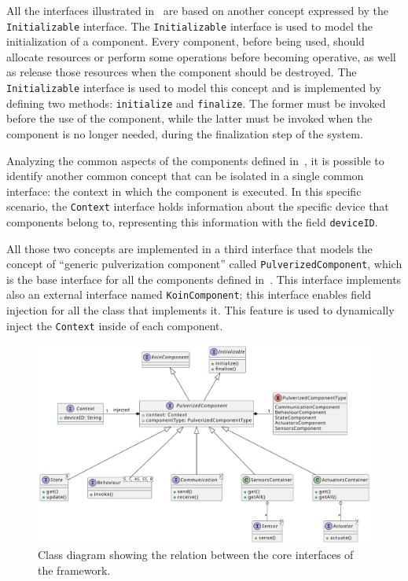 All the interfaces illustrated in~ are based on another concept expressed by the \texttt{Initializable} interface.
The \texttt{Initializable} interface is used to model the initialization of a component. Every component, before being used, should allocate resources
or perform some operations before becoming operative, as well as release those resources when the component should be destroyed.
The \texttt{Initializable} interface is used to model this concept and is implemented by defining two methods: \texttt{initialize} and
\texttt{finalize}. The former must be invoked before the use of the component, while the latter must be invoked when the component is no longer
needed, during the finalization step of the system.

Analyzing the common aspects of the components defined in~, it is possible to identify another common concept that can
be isolated in a single common interface: the context in which the component is executed. In this specific scenario, the \texttt{Context} interface
holds information about the specific device that components belong to, representing this information with the field \texttt{deviceID}.

All those two concepts are implemented in a third interface that models the concept of ``generic pulverization component'' called
\texttt{PulverizedComponent}, which is the base interface for all the components defined in~.
This interface implements also an external interface named \texttt{KoinComponent}; this interface enables field injection for all the class that
implements it. This feature is used to dynamically inject the \texttt{Context} inside of each component.

\begin{figure}[ht]
	\centering
	\includegraphics[width=\textwidth]{figures/core-impl-interfaces.pdf}
	\caption{Class diagram showing the relation between the core interfaces of the framework.}
	\label{fig:core-interfaces-class-diagram}
\end{figure}

